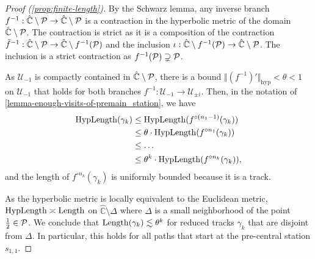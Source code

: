 \begin{proof}[Proof (\cref{prop:finite-length})] By the Schwarz lemma, any inverse branch $f^{-1}: \hat{\mathbb C} \setminus \operatorname{\mathcal P} \to \hat{\mathbb C} \setminus \operatorname{\mathcal P}$ is a contraction in the hyperbolic metric of the domain $\hat{\mathbb C} \setminus \operatorname{\mathcal P}$. The contraction is strict as it is a composition of the contraction $\tilde f^{-1}:\hat{\mathbb C} \setminus \operatorname{\mathcal P} \to \hat{\mathbb C} \setminus f^{-1} (\operatorname{\mathcal P})$ and the inclusion $\iota: \hat{\mathbb C} \setminus f^{-1} (\operatorname{\mathcal P})  \to \hat{\mathbb C} \setminus \operatorname{\mathcal P}$. The inclusion is a strict contraction as $f^{-1}(\operatorname{\mathcal P}) \supsetneq \mathcal {\operatorname{\mathcal P}}$.

As $\mathcal U_{-1}$ is compactly contained in $\hat{\mathbb C} \setminus \operatorname{\mathcal P}$, there is a bound $\Vert (f^{-1})' \Vert _{\mathrm{hyp}}< \theta < 1$ on $\mathcal U_{-1}$ that holds for both branches $f^{-1}: \mathcal U_{-1} \to \mathcal U_{\pm i}$. Then, in the notation of \cref{lemma-enough-visits-of-premain_station}, we have 
\begin{equation}
	\begin{split}
	\operatorname{HypLength}(\gamma_k)  &  \leq \operatorname{HypLength}(f^{\circ (n_1-1)}(\gamma_k)) \\ & \leq \theta \cdot \operatorname{HypLength}(f^{\circ n_1}(\gamma_k))\\ & \leq  \dots
	\\ & \leq \theta^k \cdot \operatorname{HypLength}(f^{\circ n_k}(\gamma_k)),
	\end{split}
\end{equation}
and the length of $f^{\circ n_k}(\gamma_k)$ is uniformly bounded because it is a track.

As the hyperbolic metric is locally equivalent to the Euclidean metric, $\operatorname{HypLength} \asymp \operatorname{Length}$ on $\hat {\mathbb C} \setminus \Delta$ where $\Delta$ is a small neighborhood of the point $\tfrac 12 \in \operatorname{\mathcal P}$. 
We conclude that $\operatorname{Length}(\gamma_k) \lesssim \theta^k$ for reduced tracks $\gamma_k$ that are disjoint from $\Delta$. In particular, this holds for all paths that start at the pre-central station $s_{1,1}$.



\end{proof}
